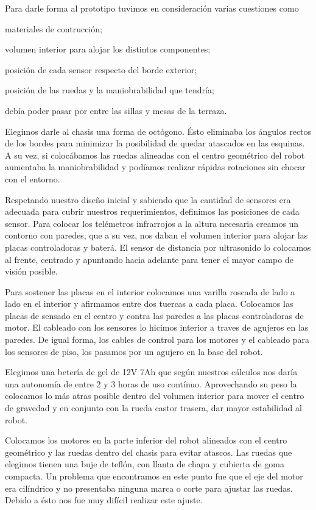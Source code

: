 Para darle forma al prototipo tuvimos en consideraci\'on varias cuestiones como
\begin{inparaenum}
\item materiales de contrucci\'on;
\item volumen interior para alojar los distintos componentes;
\item posici\'on de cada sensor respecto del borde exterior;
\item posici\'on de las ruedas y la maniobrabilidad que tendr\'ia;
\item deb\'ia poder pasar por entre las sillas y mesas de la terraza.
\end{inparaenum}

Elegimos darle al chasis una forma de oct\'ogono.
\'Esto eliminaba los \'angulos rectos de los bordes para minimizar la posibilidad de quedar
atascados en las esquinas.
A su vez, si coloc\'abamos las ruedas alineadas con el centro geom\'etrico del robot aumentaba la
maniobrabilidad y pod\'iamos realizar r\'apidas rotaciones sin chocar con el entorno.

Respetando nuestro dise\~no inicial y sabiendo que la cantidad de sensores era adecuada para cubrir
nuestros requerimientos, definimos las posiciones de cada sensor.
Para colocar los tel\'emetros infrarrojos a la altura necesaria creamos un contorno con paredes,
que a su vez, nos daban el volumen interior para alojar las placas controladoras y bater\'a.
El sensor de distancia por ultrasonido lo colocamos al frente, centrado y apuntando hacia adelante
para tener el mayor campo de visi\'on posible.

Para sostener las placas en el interior colocamos una varilla roscada de lado a lado en el interior
y afirmamos entre dos tuercas a cada placa.
Colocamos las placas de sensado en el centro y contra las paredes a las placas controladoras de motor.
El cableado con los sensores lo hicimos interior a traves de agujeros en las paredes.
De igual forma, los cables de control para los motores y el cableado para los sensores de piso, los
pasamos por un agujero en la base del robot.

Elegimos una beter\'ia de gel de 12V 7Ah que seg\'un nuestros c\'alculos nos dar\'ia una autonom\'ia
de entre 2 y 3 horas de uso cont\'inuo.
Aprovechando su peso la colocamos lo m\'as atras posible dentro del volumen interior para mover
el centro de gravedad y en conjunto con la rueda castor trasera, dar mayor estabilidad al robot.

Colocamos los motores en la parte inferior del robot alineados con el centro geom\'etrico y las
ruedas dentro del chasis para evitar atascos.
Las ruedas que elegimos tienen una buje de tefl\'on, con llanta de chapa y cubierta de goma compacta.
Un problema que encontramos en este punto fue que el eje del motor era cil\'indrico y no presentaba
ninguna marca o corte para ajustar las ruedas.
Debido a \'esto nos fue muy dif\'icil realizar este ajuste.

